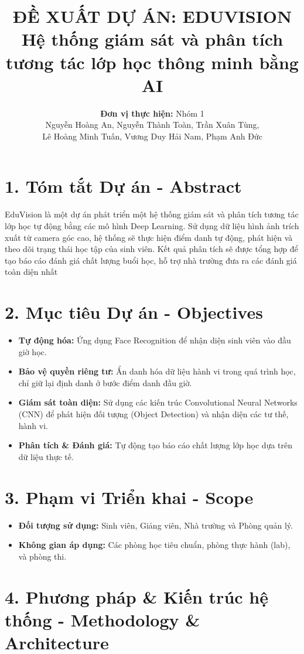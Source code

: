 \documentclass[a4paper,10pt]{article}
\title{\vspace{-1.5cm}\textbf{\huge ĐỀ XUẤT DỰ ÁN: EDUVISION}\\[0.2cm] \Large Hệ thống giám sát và phân tích tương tác lớp học thông minh bằng AI}
\author{\textbf{Đơn vị thực hiện:} Nhóm 1 \\ Nguyễn Hoàng An, Nguyễn Thành Toàn, Trần Xuân Tùng, \\ Lê Hoàng Minh Tuấn, Vương Duy Hải Nam, Phạm Anh Đức}
\date{}
\begin{document}
\maketitle
\vspace{-1cm}

\section*{1. Tóm tắt Dự án - Abstract}
EduVision là một dự án phát triển một hệ thống giám sát và phân tích tương tác lớp học tự động bằng các mô hình Deep Learning. Sử dụng dữ liệu hình ảnh trích xuất từ camera góc cao, hệ thống sẽ thực hiện điểm danh tự động, phát hiện và theo dõi trạng thái học tập của sinh viên. Kết quả phân tích sẽ được tổng hợp để tạo báo cáo đánh giá chất lượng buổi học, hỗ trợ nhà trường đưa ra các đánh giá toàn diện nhất

\section*{2. Mục tiêu Dự án - Objectives}
\begin{itemize}[noitemsep]
    \item \textbf{Tự động hóa:} Ứng dụng Face Recognition để nhận diện sinh viên vào đầu giờ học.
    \item \textbf{Bảo vệ quyền riêng tư:} Ẩn danh hóa dữ liệu hành vi trong quá trình học, chỉ giữ lại định danh ở bước điểm danh đầu giờ.
    \item \textbf{Giám sát toàn diện:} Sử dụng các kiến trúc Convolutional Neural Networks (CNN) để phát hiện đối tượng (Object Detection) và nhận diện các tư thế, hành vi.
    \item \textbf{Phân tích \& Đánh giá:} Tự động tạo báo cáo chất lượng lớp học dựa trên dữ liệu thực tế.
\end{itemize}

\section*{3. Phạm vi Triển khai - Scope}
\begin{itemize}[noitemsep]
    \item \textbf{Đối tượng sử dụng:} Sinh viên, Giảng viên, Nhà trường và Phòng quản lý.
    \item \textbf{Không gian áp dụng:} Các phòng học tiêu chuẩn, phòng thực hành (lab), và phòng thi.
\end{itemize}

\section*{4. Phương pháp \& Kiến trúc hệ thống - Methodology \& Architecture}
\end{document}
